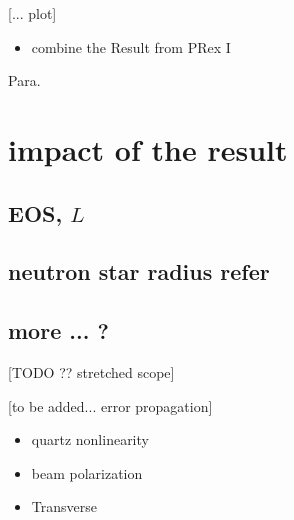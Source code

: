 [... plot]

\begin{itemize}
    \item combine the Result from PRex I
\end{itemize}
Para.
\section{impact of the result}
\subsection{EOS, $L$}


\subsection{neutron star radius refer}

\subsection{more ... ?}


[TODO ?? stretched scope]

[to be added... error propagation]
\begin{itemize}
    \item quartz nonlinearity 
    \item beam polarization 
    \item  Transverse 
\end{itemize}











